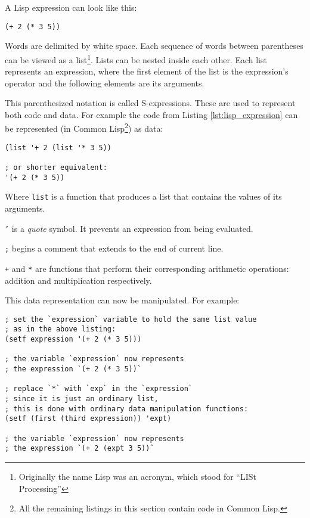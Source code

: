 A Lisp expression can look like this:
\begin{lstlisting}[label={lst:lisp_expression}]
(+ 2 (* 3 5))
\end{lstlisting}

Words are delimited by white space. Each sequence of words between parentheses can be viewed as a list\footnote{Originally the name Lisp was an acronym, which stood for ``LISt Processing''\cite[Section~1.2]{emacs_lisp_reference}\cite[Chapter~12]{practical_lisp}}. Lists can be nested inside each other. Each list represents an expression, where the first element of the list is the expression's operator and the following elements are its arguments.

This parenthesized notation is called S-expressions\cite[Section~Recursive Functions of Symbolic Expressions; Section~The LISP Programming System]{s_expressions}. These are used to represent both code and data. For example the code from Listing \ref{lst:lisp_expression} can be represented (in Common Lisp\footnote{All the remaining listings in this section contain code in Common Lisp.}) as data:
\begin{lstlisting}
(list '+ 2 (list '* 3 5))

; or shorter equivalent:
'(+ 2 (* 3 5))
\end{lstlisting}

Where \texttt{list} is a function that produces a list that contains the values of its arguments.

\texttt{'} is a \textit{quote} symbol. It prevents an expression from being evaluated.

\texttt{;} begins a comment that extends to the end of current line.

\texttt{+} and \texttt{*} are functions that perform their corresponding arithmetic operations: addition and multiplication respectively.

This data representation can now be manipulated. For example:
\begin{lstlisting}
; set the `expression` variable to hold the same list value
; as in the above listing:
(setf expression '(+ 2 (* 3 5)))

; the variable `expression` now represents
; the expression `(+ 2 (* 3 5))`

; replace `*` with `exp` in the `expression`
; since it is just an ordinary list,
; this is done with ordinary data manipulation functions:
(setf (first (third expression)) 'expt)

; the variable `expression` now represents
; the expression `(+ 2 (expt 3 5))`
\end{lstlisting}

